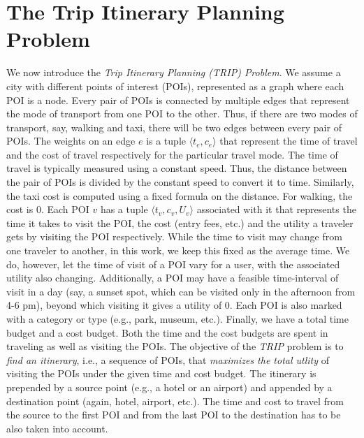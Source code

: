 \section{The Trip Itinerary Planning Problem}
\label{sec:problem}

We now introduce the \emph{Trip Itinerary Planning (TRIP) Problem}.
We assume a city with different points of interest (POIs),
represented as a graph where each POI is a node.  Every pair of POIs
is connected by multiple edges that represent the mode of transport
from one POI to the other.  Thus, if there are two modes of
transport, say, walking and taxi, there will be two edges between every
pair of POIs.  The weights on an edge $e$ is a tuple $\langle t_e,
c_e \rangle$ that represent the time of travel and the cost of travel
respectively for the particular travel mode.  The time of travel is
typically measured using a constant speed.  Thus, the distance
between the pair of POIs is divided by the constant speed to convert it
to time.  Similarly, the taxi cost is computed using a fixed formula
on the distance.  For walking, the cost is $0$.  Each POI $v$ has a
tuple $\langle t_v, c_v, U_v \rangle$ associated with it that
represents the time it takes to visit the POI, the cost (entry fees,
etc.) and the utility a traveler gets by visiting the POI
respectively.  While the
time to visit may change from one traveler to another, in this work,
we keep this fixed as the average time.  We do, however, let the time of visit of a POI
vary for a user, with the associated
utility also changing.  Additionally, a POI may have a feasible
time-interval of visit in a day (say, a sunset spot, which can be
visited only in the afternoon from 4-6 pm), beyond which visiting it
gives a utility of $0$.  Each POI is also marked with a category or type (e.g.,
park, museum, etc.).  Finally, we have a total time budget and a cost
budget.  Both the time and the cost budgets are spent in traveling as
well as visiting the POIs.  The objective of the \emph{TRIP} problem
is to \emph{find an itinerary}, i.e., a sequence of POIs, that
\emph{maximizes the total utlity} of visiting the POIs under the
given time and cost budget.  The itinerary is prepended by a source
point (e.g., a hotel or an airport) and appended by a destination
point (again, hotel, airport, etc.).  The time and cost to travel
from the source to the first POI and from the last POI to the
destination has to be also taken into account.

